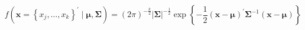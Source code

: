 \begin{equation}
    f
    \left(
    \mathbf{x}
    =
    \left\{
    x_j, \dots, x_k
    \right\}^{\prime}
    \mid
    \boldsymbol{\mu},
    \boldsymbol{\Sigma}
    \right)
    =
    \left(
    2
    \pi
    \right)^{-\frac{k}{2}}
    \left|
    \boldsymbol{\Sigma}
    \right|^{-\frac{1}{2}}
    \exp
    \left\{
    -
    \frac{1}{2}
    \left(
      \mathbf{x}
      -
      \boldsymbol{\mu}
    \right)^{\prime}
    \boldsymbol{\Sigma}^{-1}
    \left(
      \mathbf{x}
      -
      \boldsymbol{\mu}
    \right)
    \right\}
\end{equation}